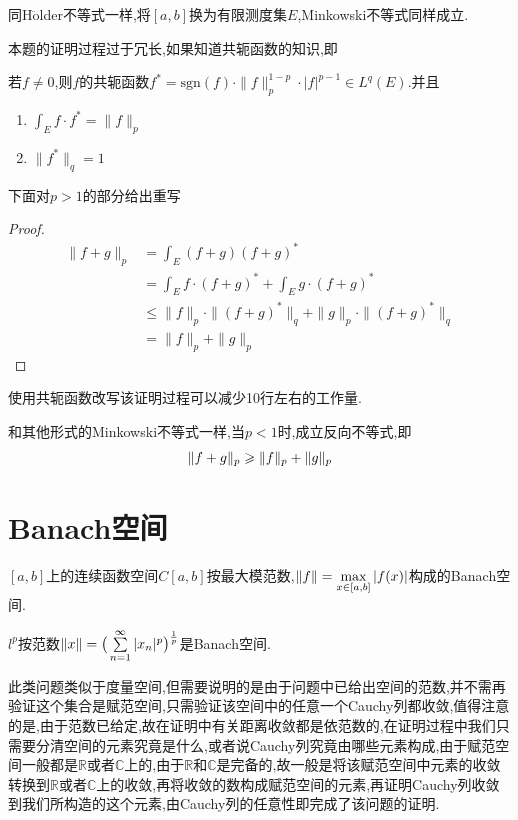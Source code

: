 \documentclass[lang=cn,18pt]{elegantbook}
\begin{document}
\begin{note}
    同H$\ddot{\text{o}}$lder不等式一样,将$[a,b]$换为有限测度集$E$,Minkowski不等式同样成立.

    本题的证明过程过于冗长,如果知道共轭函数的知识,即
    \begin{definition}
        若$f \not= 0$,则$f$的共轭函数$f^*=\text{sgn}(f) \cdot \|f\|_{p}^{1-p}\cdot |f|^{p-1} \in L^q(E).$并且
        \begin{enumerate}
            \item $\int_{E}f\cdot f^* =\|f\|_{p}$
            \item $\|f^*\|_{q}=1$
        \end{enumerate}   
    \end{definition}
    下面对$p >1$的部分给出重写
    \begin{proof}
        \begin{align*}
            \|f+g\|_{p} & =\int_{E}(f+g)(f+g)^{*} \\
            & =\int_{E}f\cdot (f+g)^{*} +\int_{E}g\cdot (f+g)^{*} \\
            & \leqslant \|f\|_p \cdot \|(f+g)^{*}\|_q +\|g\|_p \cdot \|(f+g)^{*}\|_q \\
            & = \|f\|_p +\|g\|_p
        \end{align*}
    \end{proof}
使用共轭函数改写该证明过程可以减少10行左右的工作量.
    
    和其他形式的Minkowski不等式一样,当$p < 1$时,成立反向不等式,即
    $$\Arrowvert f + g \Arrowvert_{p} \geqslant\Arrowvert f\Arrowvert_{p} + \Arrowvert g \Arrowvert_{p}$$
    
\end{note}

\section{Banach空间}
\begin{example}
    $[a,b]$上的连续函数空间$C[a,b]$按最大模范数,$\Arrowvert f \Arrowvert=\max\limits_{x \in [a,b]}|f(x)|$构成的Banach空间.
\end{example}

\begin{example}
    $l^p$按范数$\Arrowvert x \Arrowvert=\big(\sum\limits_{n=1}^{\infty}|x_n|^p\big)^{\frac{1}{p}}$是Banach空间.
\end{example}
\begin{note}
    此类问题类似于度量空间,但需要说明的是由于问题中已给出空间的范数,并不需再验证这个集合是赋范空间,只需验证该空间中的任意一个Cauchy列都收敛,值得注意的是,由于范数已给定,故在证明中有关距离收敛都是依范数的,在证明过程中我们只需要分清空间的元素究竟是什么,或者说Cauchy列究竟由哪些元素构成,由于赋范空间一般都是$\mathbb{R}$或者$\mathbb{C}$上的,由于$\mathbb{R}$和$\mathbb{C}$是完备的,故一般是将该赋范空间中元素的收敛转换到$\mathbb{R}$或者$\mathbb{C}$上的收敛,再将收敛的数构成赋范空间的元素,再证明Cauchy列收敛到我们所构造的这个元素,由Cauchy列的任意性即完成了该问题的证明.
\end{note}
\end{document}

